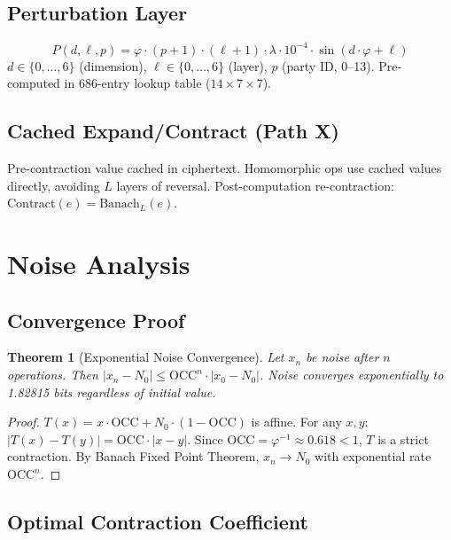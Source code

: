 \documentclass[11pt,a4paper]{article}
\newtheorem{theorem}{Theorem}[section]
\begin{document}
\subsection{Perturbation Layer}
\label{sec:perturbation}

\[
P(d, \ell, p) = \varphi \cdot (p + 1) \cdot (\ell + 1) \cdot \lambda \cdot 10^{-4} \cdot \sin(d \cdot \varphi + \ell)
\]
$d \in \{0,\ldots,6\}$ (dimension), $\ell \in \{0,\ldots,6\}$ (layer), $p$ (party ID, 0--13). Pre-computed in 686-entry lookup table ($14 \times 7 \times 7$).

\subsection{Cached Expand/Contract (Path X)}

Pre-contraction value cached in ciphertext. Homomorphic ops use cached values directly, avoiding $L$ layers of reversal. Post-computation re-contraction: $\text{Contract}(e) = \text{Banach}_L(e)$.

\section{Noise Analysis}

\subsection{Convergence Proof}

\begin{theorem}[Exponential Noise Convergence]
Let $x_n$ be noise after $n$ operations. Then $|x_n - N_0| \leq \text{OCC}^n \cdot |x_0 - N_0|$. Noise converges exponentially to 1.82815 bits regardless of initial value.
\end{theorem}
\begin{proof}
$T(x) = x \cdot \text{OCC} + N_0 \cdot (1 - \text{OCC})$ is affine. For any $x, y$: $|T(x)-T(y)| = \text{OCC} \cdot |x-y|$. Since $\text{OCC} = \varphi^{-1} \approx 0.618 < 1$, $T$ is a strict contraction. By Banach Fixed Point Theorem, $x_n \to N_0$ with exponential rate $\text{OCC}^n$.
\end{proof}

\subsection{Optimal Contraction Coefficient}
\end{document}
